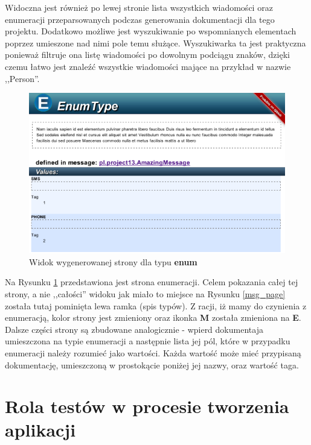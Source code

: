 \documentclass[pdflatex,11pt]{aghdpl}
\begin{document}
Widoczna jest również po lewej stronie lista wszystkich wiadomości oraz enumeracji przeparsowanych podczas generowania dokumentacji
dla tego projektu. Dodatkowo możliwe jest wyszukiwanie po wspomnianych elementach poprzez umieszone nad nimi pole temu służące.
Wyszukiwarka ta jest praktyczna ponieważ filtruje ona listę wiadomości po dowolnym podciągu znaków, dzięki czemu łatwo jest znaleźć
wszystkie wiadomości mające na przykład w nazwie ,,Person''.

\begin{figure}[hc]
 \begin{center}
  \includegraphics[width=\textwidth]{../protodoc_enum.png}
 \end{center}
 \caption{Widok wygenerowanej strony dla typu \textbf{enum}}
 \label{enum_page}
\end{figure}

Na Rysunku \ref{enum_page} przedstawiona jest strona enumeracji. Celem pokazania całej tej strony,
a nie ,,całości'' widoku jak miało to miejsce na Rysunku \ref{msg_page} została tutaj pominięta lewa ramka (spis typów).
Z racji, iż mamy do czynienia z enumeracją, kolor strony jest zmieniony oraz ikonka \textbf{M} została zmieniona na \textbf{E}.
Dalsze części strony są zbudowane analogicznie - wpierd dokumentaja umieszczona na typie enumeracji a następnie lista jej pól,
które w przypadku enumeracji należy rozumieć jako wartości. Każda wartość może mieć przypisaną dokumentację, umieszczoną w 
prostokącie poniżej jej nazwy, oraz wartość taga.

\chapter{Rola testów w procesie tworzenia aplikacji}
\label{chapter:tdd}
\end{document}
